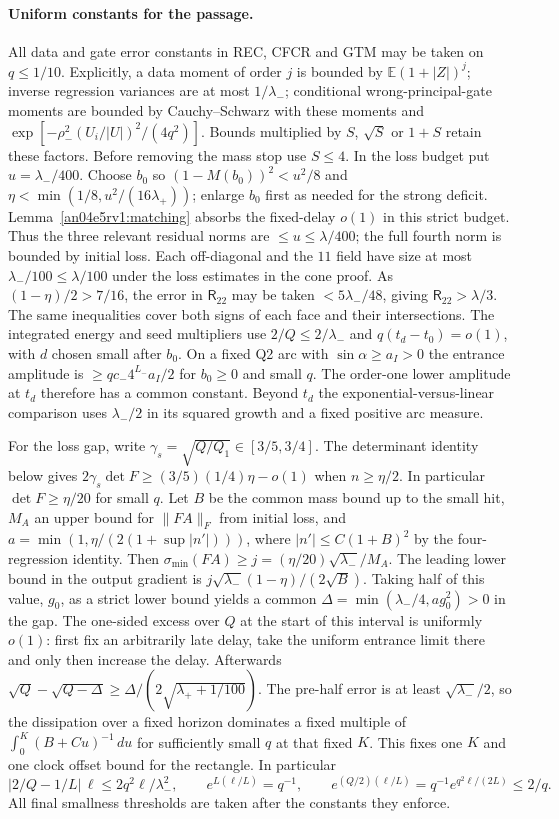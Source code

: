 \documentclass[11pt]{article}
\begin{document}
\paragraph{Uniform constants for the passage.}
All data and gate error constants in REC, CFCR and GTM may be taken on $q\le1/10$. Explicitly, a data moment of order $j$ is bounded by $\mathbb E(1+|Z|)^j$; inverse regression variances are at most $1/\lambda_-$; conditional wrong-principal-gate moments are bounded by Cauchy--Schwarz with these moments and $\exp[-\rho_-^2 (U_i/|U|)^2/(4q^2)]$. Bounds multiplied by $S$, $\sqrt S$ or $1+S$ retain these factors. Before removing the mass stop use $S\le4$. In the loss budget put $u=\lambda_-/400$. Choose $b_0$ so $(1-M(b_0))^2<u^2/8$ and $\eta<\min(1/8,u^2/(16\lambda_+))$; enlarge $b_0$ first as needed for the strong deficit. Lemma~\ref{an04e5rv1:matching} absorbs the fixed-delay $o(1)$ in this strict budget. Thus the three relevant residual norms are $\le u\le\lambda/400$; the full fourth norm is bounded by initial loss. Each off-diagonal and the $11$ field have size at most $\lambda_-/100\le\lambda/100$ under the loss estimates in the cone proof. As $(1-\eta)/2>7/16$, the error in $\mathsf R_{22}$ may be taken $<5\lambda_-/48$, giving $\mathsf R_{22}>\lambda/3$. The same inequalities cover both signs of each face and their intersections. The integrated energy and seed multipliers use $2/Q\le2/\lambda_-$ and $q(t_d-t_0)=o(1)$, with $d$ chosen small after $b_0$. On a fixed Q2 arc with $\sin\alpha\ge a_I>0$ the entrance amplitude is $\ge q c_-4^{L_-}a_I/2$ for $b_0\ge0$ and small $q$. The order-one lower amplitude at $t_d$ therefore has a common constant. Beyond $t_d$ the exponential-versus-linear comparison uses $\lambda_-/2$ in its squared growth and a fixed positive arc measure.

For the loss gap, write $\gamma_s=\sqrt{Q/Q_1}\in[3/5,3/4]$. The determinant identity below gives $2\gamma_s\det F\ge (3/5)(1/4)\eta-o(1)$ when $n\ge\eta/2$. In particular $\det F\ge\eta/20$ for small $q$. Let $B$ be the common mass bound up to the small hit, $M_A$ an upper bound for $\|FA\|_F$ from initial loss, and $a=\min(1,\eta/(2(1+\sup|n'|)))$, where $|n'|\le C(1+B)^2$ by the four-regression identity. Then $\sigma_{\min}(FA)\ge j=(\eta/20)\sqrt{\lambda_-}/M_A$. The leading lower bound in the output gradient is $j\sqrt{\lambda_-}(1-\eta)/(2\sqrt B)$. Taking half of this value, $g_0$, as a strict lower bound yields a common $\Delta=\min(\lambda_-/4,a g_0^2)>0$ in the gap. The one-sided excess over $Q$ at the start of this interval is uniformly $o(1)$: first fix an arbitrarily late delay, take the uniform entrance limit there and only then increase the delay. Afterwards $\sqrt Q-\sqrt{Q-\Delta}\ge\Delta/(2\sqrt{\lambda_++1/100})$. The pre-half error is at least $\sqrt{\lambda_-}/2$, so the dissipation over a fixed horizon dominates a fixed multiple of $\int_0^K(B+Cu)^{-1}\,du$ for sufficiently small $q$ at that fixed $K$. This fixes one $K$ and one clock offset bound for the rectangle. In particular
\[
 |2/Q-1/L|\,\ell\le 2q^2\ell/\lambda_-^2,\qquad
 e^{L(\ell/L)}=q^{-1},\qquad
 e^{(Q/2)(\ell/L)}=q^{-1}e^{q^2\ell/(2L)}\le 2/q .
\]
All final smallness thresholds are taken after the constants they enforce.
\end{document}
